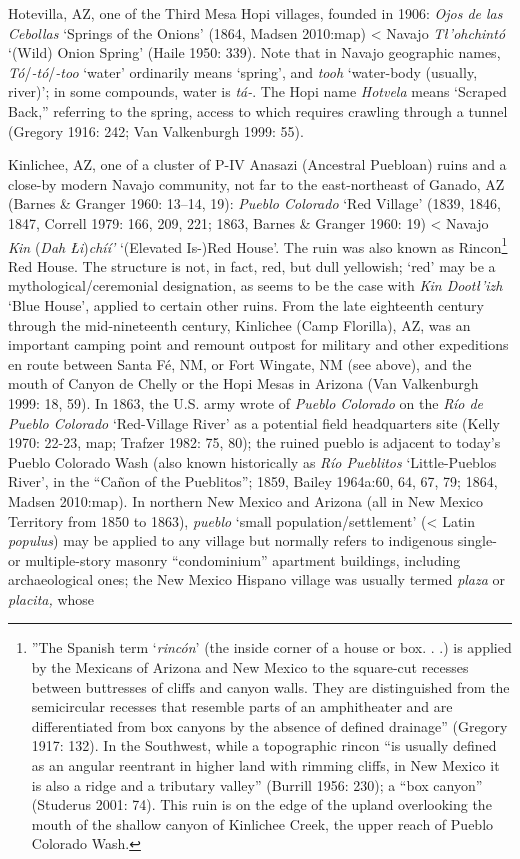 Hotevilla, AZ, one of the Third Mesa Hopi villages, founded in 1906:  \textit{Ojos de las Cebollas} ‘Springs of the Onions’ (1864, Madsen 2010:map) {\textless} Navajo \textit{Tł’ohchintó} ‘(Wild) Onion Spring’ (Haile 1950: 339).  Note that in Navajo geographic names, \textit{Tó}/\textit{{}-tó}/\textit{{}-too} ‘water’ ordinarily means ‘spring’, and \textit{tooh} ‘water-body (usually, river)’; in some compounds, water is \textit{tá-}.  The Hopi name \textit{Hotvela} means ‘Scraped Back,” referring to the spring, access to which requires crawling through a tunnel (Gregory 1916: 242; Van Valkenburgh 1999: 55).

Kinlichee, AZ, one of a cluster of P-IV Anasazi (Ancestral Puebloan) ruins and a close-by modern Navajo community, not far to the east-northeast of Ganado, AZ (Barnes \& Granger 1960: 13–14, 19):  \textit{Pueblo Colorado }‘Red Village’ (1839, 1846, 1847, Correll 1979: 166, 209, 221; 1863, Barnes \& Granger 1960: 19) {\textless} Navajo \textit{Kin }(\textit{Dah Łi})\textit{chíí' }‘(Elevated Is-)Red House’.  The ruin was also known as Rincon\footnote{”The Spanish term ‘\textit{rincón}’ (the inside corner of a house or box. . .) is applied by the Mexicans of Arizona and New Mexico to the square-cut recesses between buttresses of cliffs and canyon walls.  They are distinguished from the semicircular recesses that resemble parts of an amphitheater and are differentiated from box canyons by the absence of defined drainage” (Gregory 1917: 132).  In the Southwest, while a topographic rincon “is usually defined as an angular reentrant in higher land with rimming cliffs, in New Mexico it is also a ridge and a tributary valley” (Burrill 1956: 230); a “box canyon” (Studerus 2001: 74).  This ruin is on the edge of the upland overlooking the mouth of the shallow canyon of Kinlichee Creek, the upper reach of Pueblo Colorado Wash.} Red House.  The structure is not, in fact, red, but dull yellowish; ‘red’ may be a mythological/ceremonial designation, as seems to be the case with \textit{Kin Dootł’izh} ‘Blue House’, applied to certain other ruins.  From the late eighteenth century through the mid-nineteenth century, Kinlichee (Camp Florilla), AZ, was an important camping point and remount outpost for military and other expeditions en route between Santa Fé, NM, or Fort Wingate, NM (see above), and the mouth of Canyon de Chelly or the Hopi Mesas in Arizona (Van Valkenburgh 1999: 18, 59).  In 1863, the U.S. army wrote of \textit{Pueblo Colorado} on the \textit{Río de Pueblo Colorado} ‘Red-Village River’ as a potential field headquarters site (Kelly 1970: 22-23, map; Trafzer 1982: 75, 80); the ruined pueblo is adjacent to today’s Pueblo Colorado Wash (also known historically as \textit{Río Pueblitos }‘Little-Pueblos River’, in the “Cañon of the Pueblitos”; 1859, Bailey 1964a:60, 64, 67, 79; 1864, Madsen 2010:map).  In northern New Mexico and Arizona (all in New Mexico Territory from 1850 to 1863), \textit{pueblo} ‘small population/settlement’ ({\textless} Latin \textit{populus}) may be applied to any village but normally refers to indigenous single- or multiple-story masonry “condominium” apartment buildings, including archaeological ones; the New Mexico Hispano village was usually termed \textit{plaza }or\textit{ placita, }whose 